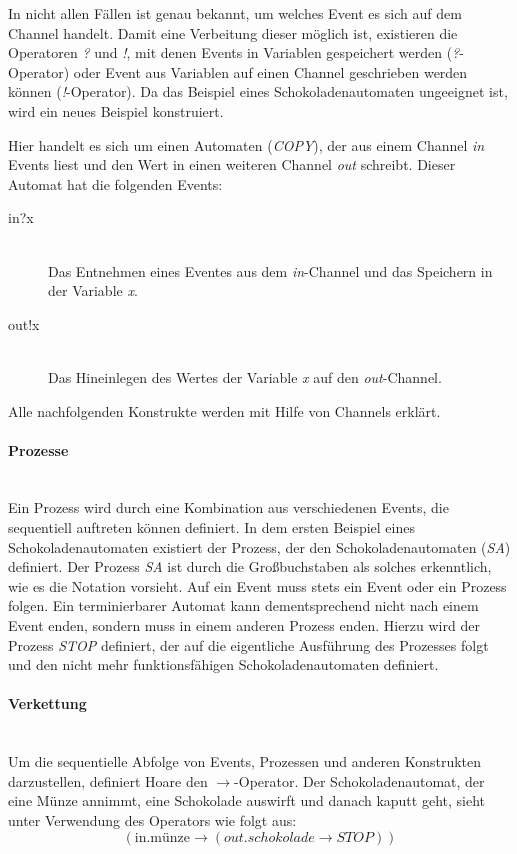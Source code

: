 \documentclass[12pt,a4paper,parskip=half,listof=totoc]{scrreprt}
\begin{document}
In nicht allen Fällen ist genau bekannt, um welches Event es sich auf dem Channel handelt. Damit eine Verbeitung dieser möglich ist, existieren die Operatoren \textit{?} und \textit{!}, mit denen Events in Variablen gespeichert werden (\textit{?}-Operator) oder Event aus Variablen auf einen Channel geschrieben werden können (\textit{!}-Operator). Da das Beispiel eines Schokoladenautomaten ungeeignet ist, wird ein neues Beispiel konstruiert. 

Hier handelt es sich um einen Automaten (\textit{COPY}), der aus einem Channel \textit{in} Events liest und den Wert in einen weiteren Channel \textit{out} schreibt. Dieser Automat hat die folgenden Events:

\begin{description}
\item[in?x]\hfill \\
Das Entnehmen eines Eventes aus dem \textit{in}-Channel und das Speichern in der Variable \textit{x}.
\item[out!x]\hfill \\
Das Hineinlegen des Wertes der Variable \textit{x} auf den \textit{out}-Channel.
\end{description}

Alle nachfolgenden Konstrukte werden mit Hilfe von Channels erklärt.

\paragraph{Prozesse}
\ \\
Ein Prozess wird durch eine Kombination aus verschiedenen Events, die sequentiell auftreten können definiert. In dem ersten Beispiel eines Schokoladenautomaten existiert der Prozess, der den  Schokoladenautomaten (\textit{SA}) definiert. Der Prozess \textit{SA} ist durch die Großbuchstaben als solches erkenntlich, wie es die Notation vorsieht. Auf ein Event muss stets ein Event oder ein Prozess folgen. Ein terminierbarer Automat kann dementsprechend nicht nach einem Event enden, sondern muss in einem anderen Prozess enden. Hierzu wird der Prozess \textit{STOP} definiert, der auf die eigentliche Ausführung des Prozesses folgt und den nicht mehr funktionsfähigen Schokoladenautomaten definiert.

\paragraph{Verkettung}
\ \\
Um die sequentielle Abfolge von Events, Prozessen und anderen Konstrukten darzustellen, definiert Hoare den 
$ \rightarrow $-Operator. Der Schokoladenautomat, der eine Münze annimmt, eine Schokolade auswirft und danach kaputt geht, sieht unter Verwendung des Operators wie folgt aus:
\[(\text{in.münze} \rightarrow (out.schokolade \rightarrow STOP))\]
\end{document}
